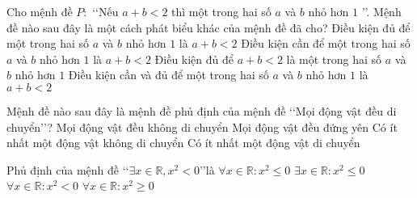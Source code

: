 \begin{ex}%
	Cho mệnh đề $P\colon$ \lq\lq Nếu $a+b<2$ thì một trong hai số $a$ và $b$ nhỏ hơn $1$ \rq\rq . Mệnh đề nào sau đây là một cách phát biểu khác của mệnh đề đã cho?
	\choice
	{\True Điều kiện đủ để một trong hai số $a$ và $b$ nhỏ hơn $1$ là $a+b<2$}
	{Điều kiện cần để một trong hai số $a$ và $b$ nhỏ hơn $1$ là $a+b<2$}
	{Điều kiện đủ để $a+b<2$ là một trong hai số $a$ và $b$ nhỏ hơn $1$}
	{Điều kiện cần và đủ để một trong hai số $a$ và $b$ nhỏ hơn $1$ là $a+b<2$}
\end{ex}

\begin{ex}%
	Mệnh đề nào sau đây là mệnh đề phủ định của mệnh đề \lq\lq Mọi động vật đều di chuyển\rq\rq ?
	\choice
	{Mọi động vật đều không di chuyển}
	{Mọi động vật đều đứng yên}
	{\True Có ít nhất một động vật không di chuyển}
	{Có ít nhất một động vật di chuyển}
\end{ex}

\begin{ex}%
	Phủ định của mệnh đề \lq\lq $\exists x\in\mathbb{R}, x^2<0$\rq\rq  là
	\choice
	{$\forall x\in\mathbb{R}\colon x^2\le0$}
	{$\exists x\in\mathbb{R}\colon x^2\le0$}
	{$\forall x\in\mathbb{R}\colon x^2<0$}
	{\True $\forall x\in\mathbb{R}\colon x^2\ge0$}
\end{ex}

